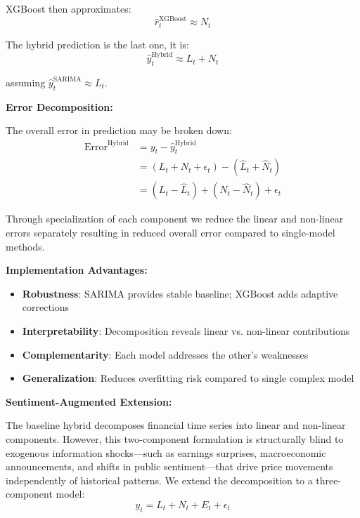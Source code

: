 \documentclass[12pt,a4paper]{article}
\begin{document}
XGBoost then approximates:
\begin{equation}
\hat{r}_t^{\text{XGBoost}} \approx N_t
\end{equation}

The hybrid prediction is the last one, it is:
\begin{equation}
\hat{y}_t^{\text{Hybrid}} \approx L_t + N_t
\end{equation}

assuming $\hat{y}_t^{\text{SARIMA}} \approx L_t$.

\textbf{Error Decomposition:}

The overall error in prediction may be broken down:
\begin{align}
\text{Error}^{\text{Hybrid}} &= y_t - \hat{y}_t^{\text{Hybrid}} \\
&= (L_t + N_t + \epsilon_t) - (\hat{L}_t + \hat{N}_t) \\
&= (L_t - \hat{L}_t) + (N_t - \hat{N}_t) + \epsilon_t
\end{align}

Through specialization of each component we reduce the linear and non-linear errors separately resulting in reduced overall error compared to single-model methods.

\textbf{Implementation Advantages:}
\begin{itemize}
    \item \textbf{Robustness}: SARIMA provides stable baseline; XGBoost adds adaptive corrections
    \item \textbf{Interpretability}: Decomposition reveals linear vs. non-linear contributions
    \item \textbf{Complementarity}: Each model addresses the other's weaknesses
    \item \textbf{Generalization}: Reduces overfitting risk compared to single complex model
\end{itemize}

\textbf{Sentiment-Augmented Extension:}

The baseline hybrid decomposes financial time series into linear and non-linear components. However, this two-component formulation is structurally blind to exogenous information shocks---such as earnings surprises, macroeconomic announcements, and shifts in public sentiment---that drive price movements independently of historical patterns. We extend the decomposition to a three-component model:
\begin{equation}
y_t = L_t + N_t + E_t + \epsilon_t
\end{equation}
\end{document}
